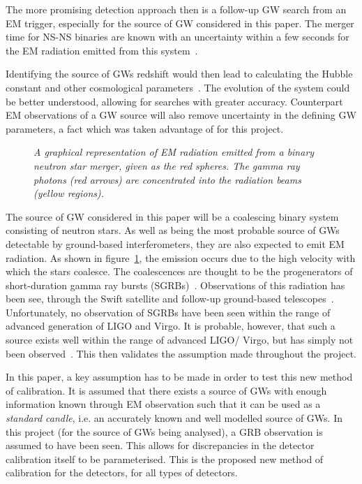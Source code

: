 \documentclass{jpconf}
\begin{document}
The more promising detection approach then is a follow-up GW search from an EM trigger, especially for the source of GW considered in this paper. The merger time for NS-NS binaries are known with an uncertainty within a few seconds for the EM radiation emitted from this system~\cite{grb}. 


 Identifying the source of GWs redshift would then lead to calculating the Hubble constant and other cosmological parameters~\cite{Schutz}. The evolution of the system could be better understood, allowing for searches with greater accuracy. Counterpart EM observations of a GW source will also remove uncertainty in the defining GW parameters, a fact which was taken advantage of for this project. 


\begin{figure}
  \centering
  
  \caption{\textit{A graphical representation of EM radiation emitted from a binary neutron star merger, given as the red spheres. The gamma ray photons (red arrows) are concentrated into the radiation beams (yellow regions). }}
  \label{fig:grb}
\end{figure}
 

The source of GW considered in this paper will be a coalescing binary system consisting of neutron stars. As well as being the most probable source of GWs detectable by ground-based interferometers, they are also expected to emit EM radiation. As shown in figure~\ref{fig:grb}, the emission occurs due to the high velocity with which the stars coalesce. The coalescences are thought to be the progenerators of short-duration gamma ray bursts (SGRBs)~\cite{grb}. Observations of this radiation has been see, through the Swift satellite and follow-up ground-based telescopes~\cite{swift}. Unfortunately, no observation of SGRBs have been seen within the range of advanced generation of LIGO and Virgo. It is probable, however, that such a source exists well within the range of advanced LIGO/ Virgo, but has simply not been observed~\cite{grb}. This then validates the assumption made throughout the project.


In this paper, a key assumption has to be made in order to test this new method of calibration. It is assumed that there exists a source of GWs with enough information known through EM observation such that it can be used as a \textit{standard candle}, i.e. an accurately known and well modelled source of GWs. In this project (for the source of GWs being analysed), a GRB observation is assumed to have been seen. This allows for discrepancies in the detector calibration itself to be parameterised. This is the proposed new method of calibration for the detectors, for all types of detectors. 
\end{document}
